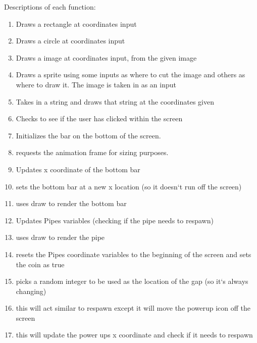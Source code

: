\documentclass[11pt, oneside]{article}   	%
\begin{document}
Descriptions of each function:
\begin{enumerate}
\item  Draws a rectangle at coordinates input

\item  Draws a circle at coordinates input

\item  Draws a image at coordinates input, from the given image

\item  Draws a sprite using some inputs as where to cut the image and others as where to draw it. The image is taken in as an input

\item  Takes in a string and draws that string at the coordinates given

\item Checks to see if the user has clicked within the screen

\item Initializes the bar on the bottom of the screen.

\item requests the animation frame for sizing purposes.

\item Updates x coordinate of the bottom bar

\item sets the bottom bar at a new x location (so it doesn`t run off the screen)

\item uses draw to render the bottom bar 

\item Updates Pipes variables (checking if the pipe needs to respawn)

\item uses draw to render the pipe

\item resets the Pipes coordinate variables to the beginning of the screen and sets the coin as true

\item  picks a random integer to be used as the location of the gap (so it`s always changing)

\item this will act similar to respawn except it will move the powerup icon off the screen 

\item this will update the power ups x coordinate and check if it needs to respawn


\end{enumerate}
\end{document}

